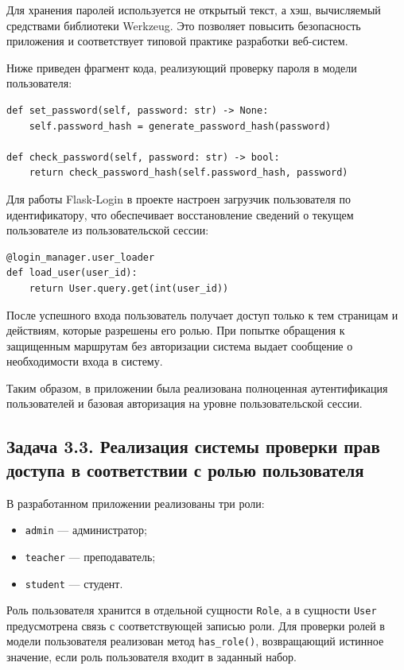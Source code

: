 \documentclass[14pt,a4paper]{extarticle}
\begin{document}
Для хранения паролей используется не открытый текст, а хэш, вычисляемый средствами библиотеки Werkzeug. Это позволяет повысить безопасность приложения и соответствует типовой практике разработки веб-систем.

Ниже приведен фрагмент кода, реализующий проверку пароля в модели пользователя:

\begin{lstlisting}
def set_password(self, password: str) -> None:
    self.password_hash = generate_password_hash(password)

def check_password(self, password: str) -> bool:
    return check_password_hash(self.password_hash, password)
\end{lstlisting}

Для работы Flask-Login в проекте настроен загрузчик пользователя по идентификатору, что обеспечивает восстановление сведений о текущем пользователе из пользовательской сессии:

\begin{lstlisting}
@login_manager.user_loader
def load_user(user_id):
    return User.query.get(int(user_id))
\end{lstlisting}

После успешного входа пользователь получает доступ только к тем страницам и действиям, которые разрешены его ролью. При попытке обращения к защищенным маршрутам без авторизации система выдает сообщение о необходимости входа в систему.

Таким образом, в приложении была реализована полноценная аутентификация пользователей и базовая авторизация на уровне пользовательской сессии.

\subsection{Задача 3.3. Реализация системы проверки прав доступа в соответствии с ролью пользователя}

В разработанном приложении реализованы три роли:

\begin{itemize}[leftmargin=1.25cm]
    \item \texttt{admin} --- администратор;
    \item \texttt{teacher} --- преподаватель;
    \item \texttt{student} --- студент.
\end{itemize}

Роль пользователя хранится в отдельной сущности \texttt{Role}, а в сущности \texttt{User} предусмотрена связь с соответствующей записью роли. Для проверки ролей в модели пользователя реализован метод \texttt{has\_role()}, возвращающий истинное значение, если роль пользователя входит в заданный набор.
\end{document}
